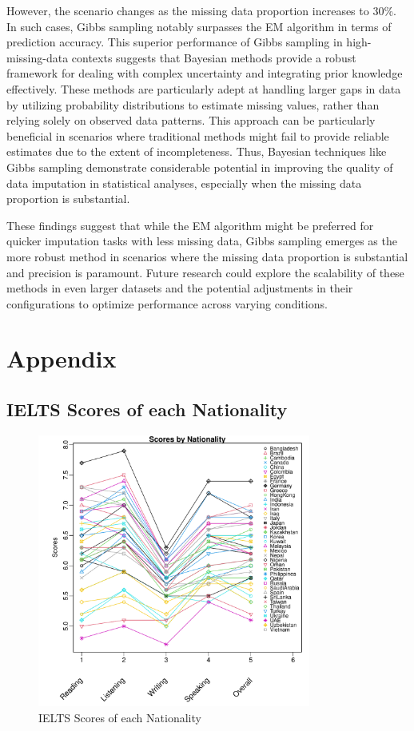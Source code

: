 \documentclass[12pt]{article}
\begin{document}
However, the scenario changes as the missing data proportion increases to 30\%. In such cases, Gibbs sampling notably surpasses the EM algorithm in terms of prediction accuracy. This superior performance of Gibbs sampling in high-missing-data contexts suggests that Bayesian methods provide a robust framework for dealing with complex uncertainty and integrating prior knowledge effectively. These methods are particularly adept at handling larger gaps in data by utilizing probability distributions to estimate missing values, rather than relying solely on observed data patterns. This approach can be particularly beneficial in scenarios where traditional methods might fail to provide reliable estimates due to the extent of incompleteness. Thus, Bayesian techniques like Gibbs sampling demonstrate considerable potential in improving the quality of data imputation in statistical analyses, especially when the missing data proportion is substantial.

These findings suggest that while the EM algorithm might be preferred for quicker imputation tasks with less missing data, Gibbs sampling emerges as the more robust method in scenarios where the missing data proportion is substantial and precision is paramount. Future research could explore the scalability of these methods in even larger datasets and the potential adjustments in their configurations to optimize performance across varying conditions.

\printbibliography

\newpage

\section{Appendix}
\subsection{IELTS Scores of each Nationality}
\label{app:IELTS}
\begin{figure}[htpb]
	\centering
	\includegraphics[width=0.8\textwidth]{pic/IELTS.pdf}
	\caption{IELTS Scores of each Nationality}
	\label{fig:IELTS}
\end{figure}
\end{document}
